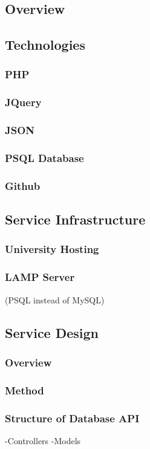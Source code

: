 \documentclass[11pt]{article}
\begin{document}
	\subsection{Overview}
	\subsection{Technologies}
		\subsubsection{PHP}
		\subsubsection{JQuery}
		\subsubsection{JSON}
		\subsubsection{PSQL Database}
		\subsubsection{Github}
	\subsection{Service Infrastructure}
		\subsubsection{University Hosting}
		\subsubsection{LAMP Server}
			(PSQL instead of MySQL)
	\subsection{Service Design}
		\subsubsection{Overview}
		\subsubsection{Method}
		\subsubsection{Structure of Database API}
		-Controllers
		-Models
\end{document}
